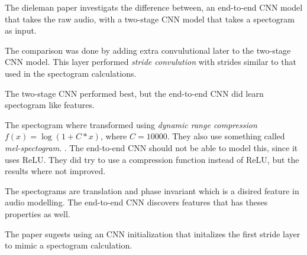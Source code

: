 
The dieleman paper investigats the difference between, an end-to-end CNN model
that takes the raw audio, with a two-stage CNN model that takes a spectogram
as input.

The comparison was done by adding extra convulutional later to the two-stage
CNN model. This layer performed \textit{stride convulution} with strides
similar to that used in the spectogram calculations.

The two-stage CNN performed best, but the end-to-end CNN did learn spectogram
like features.

The spectogram where transformed using \textit{dynamic range compression}
$f(x) = \log(1 + C * x)$, where $C = 10000$. They also use something called
\textit{mel-spectogram}. . The end-to-end CNN
should not be able to model this, since it uses ReLU. They did try to use a
compression function instead of ReLU, but the results where not improved.

The spectograms are translation and phase invariant which is a disired feature
in audio modelling. The end-to-end CNN discovers features that has theses
properties as well.

The paper sugests using an CNN initialization that initalizes the first stride
layer to mimic a spectogram calculation.
